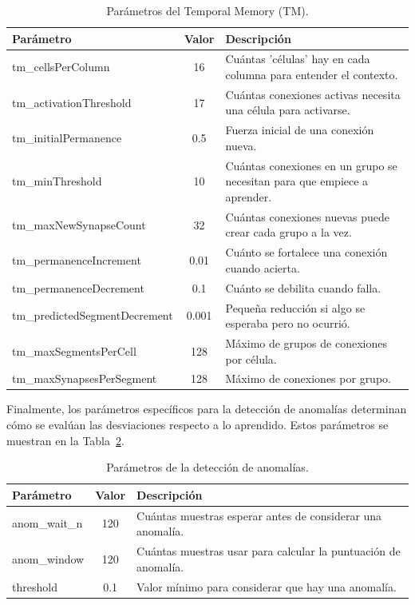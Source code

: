 \begin{table}[H]
  \centering
  \small
  \begin{tabular}{l c p{7cm}}
    \hline
    \textbf{Parámetro} & \textbf{Valor} & \textbf{Descripción} \\
    \hline
    tm\_cellsPerColumn & 16 & Cuántas 'células' hay en cada columna para entender el contexto. \\
    tm\_activationThreshold & 17 & Cuántas conexiones activas necesita una célula para activarse. \\
    tm\_initialPermanence & 0.5 & Fuerza inicial de una conexión nueva. \\
    tm\_minThreshold & 10 & Cuántas conexiones en un grupo se necesitan para que empiece a aprender. \\
    tm\_maxNewSynapseCount & 32 & Cuántas conexiones nuevas puede crear cada grupo a la vez. \\
    tm\_permanenceIncrement & 0.01 & Cuánto se fortalece una conexión cuando acierta. \\
    tm\_permanenceDecrement & 0.1 & Cuánto se debilita cuando falla. \\
    tm\_predictedSegmentDecrement & 0.001 & Pequeña reducción si algo se esperaba pero no ocurrió. \\
    tm\_maxSegmentsPerCell & 128 & Máximo de grupos de conexiones por célula. \\
    tm\_maxSynapsesPerSegment & 128 & Máximo de conexiones por grupo. \\
    \hline
  \end{tabular}
  \caption{Parámetros del Temporal Memory (TM).}
  \label{tab:tm_params}
\end{table}

\medskip

Finalmente, los parámetros específicos para la detección de anomalías determinan cómo se evalúan las desviaciones respecto a lo aprendido. Estos parámetros se muestran en la Tabla~\ref{tab:anomaly_params}.

\begin{table}[H]
  \centering
  \small
  \begin{tabular}{l c p{7cm}}
    \hline
    \textbf{Parámetro} & \textbf{Valor} & \textbf{Descripción} \\
    \hline
    anom\_wait\_n & 120 & Cuántas muestras esperar antes de considerar una anomalía. \\
    anom\_window & 120 & Cuántas muestras usar para calcular la puntuación de anomalía. \\
    threshold & 0.1 & Valor mínimo para considerar que hay una anomalía. \\
    \hline
  \end{tabular}
  \caption{Parámetros de la detección de anomalías.}
  \label{tab:anomaly_params}
\end{table}

